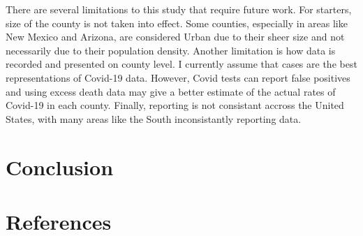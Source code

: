\documentclass[
  12pt,
]{article}
\begin{document}
There are several limitations to this study that require future work. For starters, size of the county is not taken into effect. Some counties, especially in areas like New Mexico and Arizona, are considered Urban due to their sheer size and not necessarily due to their population density. Another limitation is how data is recorded and presented on county level. I currently assume that cases are the best representations of Covid-19 data. However, Covid tests can report false positives and using excess death data may give a better estimate of the actual rates of Covid-19 in each county. Finally, reporting is not consistant accross the United States, with many areas like the South inconsistantly reporting data.

\hypertarget{conclusion}{%
\section{Conclusion}\label{conclusion}}

\hypertarget{references}{%
\section{References}\label{references}}
\end{document}
